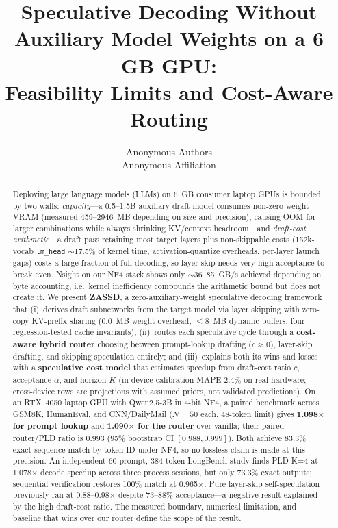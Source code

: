 \documentclass[10pt,twocolumn,letterpaper]{article}
\title{\LARGE \textbf{Speculative Decoding Without Auxiliary Model Weights on a 6 GB GPU:\\Feasibility Limits and Cost-Aware Routing}}
\author{
  Anonymous Authors\\
  Anonymous Affiliation\\
}
\date{}
\begin{document}
\maketitle

\begin{abstract}
Deploying large language models (LLMs) on 6~GB consumer laptop GPUs is bounded by two walls: \textit{capacity}---a 0.5--1.5B auxiliary draft model consumes non-zero weight VRAM (measured 459--2946~MB depending on size and precision), causing OOM for larger combinations while always shrinking KV/context headroom---and \textit{draft-cost arithmetic}---a draft pass retaining most target layers plus non-skippable costs (152k-vocab \texttt{lm\_head} $\sim$17.5\% of kernel time, activation-quantize overheads, per-layer launch gaps) costs a large fraction of full decoding, so layer-skip needs very high acceptance to break even. Nsight on our NF4 stack shows only $\sim$36--85~GB/s achieved depending on byte accounting, i.e.\ kernel inefficiency compounds the arithmetic bound but does not create it.
We present \textbf{ZASSD}, a zero-auxiliary-weight speculative decoding framework that (i)~derives draft subnetworks from the target model via layer skipping with zero-copy KV-prefix sharing (0.0~MB weight overhead, $\le$8~MB dynamic buffers, four regression-tested cache invariants); (ii)~routes each speculative cycle through a \textbf{cost-aware hybrid router} choosing between prompt-lookup drafting ($c{\approx}0$), layer-skip drafting, and skipping speculation entirely; and (iii)~explains both its wins and losses with a \textbf{speculative cost model} that estimates speedup from draft-cost ratio $c$, acceptance $\alpha$, and horizon $K$ (in-device calibration MAPE 2.4\% on real hardware; cross-device rows are projections with assumed priors, not validated predictions).
On an RTX~4050 laptop GPU with Qwen2.5-3B in 4-bit NF4, a paired benchmark across GSM8K, HumanEval, and CNN/DailyMail ($N{=}50$ each, 48-token limit) gives \textbf{1.098$\times$ for prompt lookup} and \textbf{1.090$\times$ for the router} over vanilla; their paired router/PLD ratio is 0.993 (95\% bootstrap CI $[0.988,0.999]$). Both achieve 83.3\% exact sequence match by token ID under NF4, so no lossless claim is made at this precision. An independent 60-prompt, 384-token LongBench study finds PLD K=4 at 1.078$\times$ decode speedup across three process sessions, but only 73.3\% exact outputs; sequential verification restores 100\% match at 0.965$\times$. Pure layer-skip self-speculation previously ran at 0.88--0.98$\times$ despite 73--88\% acceptance---a negative result explained by the high draft-cost ratio. The measured boundary, numerical limitation, and baseline that wins over our router define the scope of the result.
\end{abstract}
\end{document}
